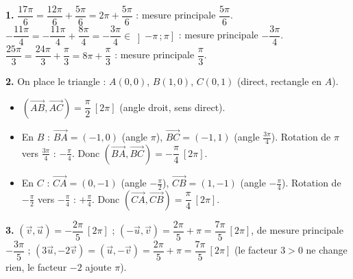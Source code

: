 \documentclass[11pt]{article}
\begin{document}
\begin{corrige}
\textbf{1.} $\dfrac{17\pi}{6} = \dfrac{12\pi}{6} + \dfrac{5\pi}{6} = 2\pi + \dfrac{5\pi}{6}$ : mesure principale $\dfrac{5\pi}{6}$. \quad $-\dfrac{11\pi}{4} = -\dfrac{11\pi}{4} + \dfrac{8\pi}{4} = -\dfrac{3\pi}{4} \in \left]-\pi\,;\pi\right]$ : mesure principale $-\dfrac{3\pi}{4}$. \quad $\dfrac{25\pi}{3} = \dfrac{24\pi}{3} + \dfrac{\pi}{3} = 8\pi + \dfrac{\pi}{3}$ : mesure principale $\dfrac{\pi}{3}$.

\textbf{2.} On place le triangle : $A(0,0)$, $B(1,0)$, $C(0,1)$ (direct, rectangle en $A$).
\begin{itemize}
  \item $(\overrightarrow{AB}, \overrightarrow{AC}) = \dfrac{\pi}{2} \ [2\pi]$ (angle droit, sens direct).
  \item En $B$ : $\overrightarrow{BA}=(-1,0)$ (angle $\pi$), $\overrightarrow{BC}=(-1,1)$ (angle $\frac{3\pi}{4}$). Rotation de $\pi$ vers $\frac{3\pi}{4}$ : $-\frac{\pi}{4}$. Donc $(\overrightarrow{BA}, \overrightarrow{BC}) = -\dfrac{\pi}{4} \ [2\pi]$.
  \item En $C$ : $\overrightarrow{CA}=(0,-1)$ (angle $-\frac{\pi}{2}$), $\overrightarrow{CB}=(1,-1)$ (angle $-\frac{\pi}{4}$). Rotation de $-\frac{\pi}{2}$ vers $-\frac{\pi}{4}$ : $+\frac{\pi}{4}$. Donc $(\overrightarrow{CA}, \overrightarrow{CB}) = \dfrac{\pi}{4} \ [2\pi]$.
\end{itemize}

\textbf{3.} $(\vec{v}, \vec{u}) = -\dfrac{2\pi}{5} \ [2\pi]$ ; \quad $(-\vec{u}, \vec{v}) = \dfrac{2\pi}{5} + \pi = \dfrac{7\pi}{5} \ [2\pi]$, de mesure principale $-\dfrac{3\pi}{5}$ ; \quad $(3\vec{u}, -2\vec{v}) = (\vec{u}, -\vec{v}) = \dfrac{2\pi}{5} + \pi = \dfrac{7\pi}{5} \ [2\pi]$ (le facteur $3 > 0$ ne change rien, le facteur $-2$ ajoute $\pi$).
\end{corrige}
\end{document}
